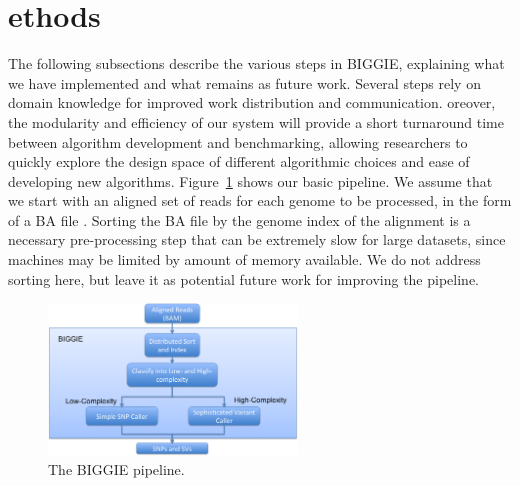 \documentclass[10pt]{article}
\newcommand\TODO[1]{\textcolor{red}{TODO: #1}}
\begin{document}


\section{ethods}

The following subsections describe the various steps in BIGGIE, explaining what we have implemented and what remains as future work.
Several steps
rely on domain knowledge for improved work distribution and communication.
oreover, the modularity and efficiency of our system will provide a short 
turnaround time between algorithm development and benchmarking, allowing
researchers to quickly explore the design space of different algorithmic
choices and ease of developing new algorithms. Figure~\ref{fig:pipeline} shows our basic pipeline. We assume that we start with an
aligned set of reads for each genome to be processed, in the form of a BA file
\cite{samtools}.
Sorting the BA file by the genome index of the alignment is a necessary pre-processing step that can be extremely slow for large datasets, since machines may be limited by amount of memory available.
We do not address sorting here, but leave it as potential future work for improving the pipeline.

\begin{figure}[h!]
  	\includegraphics[width=2.6in]{figs/pipeline.png}
	\caption{The BIGGIE pipeline.}
	\label{fig:pipeline}
\end{figure}
 
\end{document}
